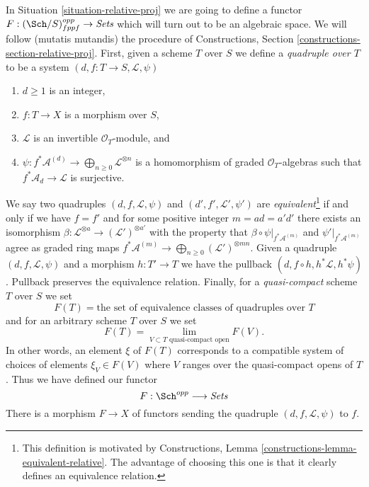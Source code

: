 \noindent
In Situation \ref{situation-relative-proj} we are going to define
a functor $F : (\Sch/S)_{fppf}^{opp} \to \textit{Sets}$ which will
turn out to be an algebraic space. We will follow (mutatis mutandis)
the procedure of
Constructions, Section \ref{constructions-section-relative-proj}.
First, given a scheme $T$ over $S$ we define a
{\it quadruple over $T$} to be a system
$(d, f : T \to S, \mathcal{L}, \psi)$
\begin{enumerate}
\item $d \geq 1$ is an integer,
\item $f : T \to X$ is a morphism over $S$,
\item $\mathcal{L}$ is an invertible $\mathcal{O}_T$-module, and
\item
$\psi : f^*\mathcal{A}^{(d)} \to \bigoplus_{n \geq 0}\mathcal{L}^{\otimes n}$
is a homomorphism of graded $\mathcal{O}_T$-algebras
such that $f^*\mathcal{A}_d \to \mathcal{L}$ is surjective.
\end{enumerate}
We say two quadruples $(d, f, \mathcal{L}, \psi)$ and
$(d', f', \mathcal{L}', \psi')$ are {\it equivalent}\footnote{This
definition is motivated by
Constructions, Lemma \ref{constructions-lemma-equivalent-relative}.
The advantage of choosing this one is that it clearly defines
an equivalence relation.}
if and only if
we have $f = f'$ and for some positive integer $m = ad = a'd'$
there exists an isomorphism
$\beta : \mathcal{L}^{\otimes a} \to (\mathcal{L}')^{\otimes a'}$
with the property that $\beta \circ \psi|_{f^*\mathcal{A}^{(m)}}$
and $\psi'|_{f^*\mathcal{A}^{(m)}}$ agree
as graded ring maps
$f^*\mathcal{A}^{(m)} \to \bigoplus_{n \geq 0} (\mathcal{L}')^{\otimes mn}$.
Given a quadruple $(d, f, \mathcal{L}, \psi)$
and a morphism $h : T' \to T$ we have the pullback
$(d, f \circ h, h^*\mathcal{L}, h^*\psi)$. Pullback preserves 
the equivalence relation. Finally, for a {\it quasi-compact} scheme $T$
over $S$ we set
$$
F(T) = \text{the set of equivalence classes of quadruples over }T
$$
and for an arbitrary scheme $T$ over $S$ we set
$$
F(T)
=
\lim_{V \subset T\text{ quasi-compact open}} F(V).
$$
In other words, an element $\xi$ of $F(T)$ corresponds to a compatible
system of choices of elements $\xi_V \in F(V)$ where $V$ ranges over the
quasi-compact opens of $T$. Thus we have defined our functor
\begin{equation}
\label{equation-proj}
F : \Sch^{opp} \longrightarrow \textit{Sets}
\end{equation}
There is a morphism $F \to X$ of functors sending the quadruple
$(d, f, \mathcal{L}, \psi)$ to $f$.

